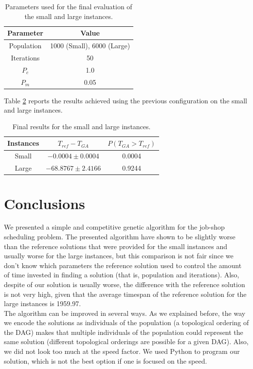 \documentclass[10pt,a4paper]{article}
\begin{document}
\begin{table}[h]
\centering
\begin{tabular}{|c|c|}
\hline
Parameter & Value \\
\hline
Population &  1000 (Small), 6000 (Large)\\
Iterations & 50\\
$P_c$ & 1.0\\
$P_m$ & 0.05\\
\hline
\end{tabular}
\caption{Parameters used for the final evaluation of the small and large instances.}
\label{tab:optimal_params}
\end{table}

Table \ref{tab:final_results} reports the results achieved using the previous configuration on the small and large instances.\\

\begin{table}[h]
\centering
\begin{tabular}{|c|c|c|}
\hline
Instances & $T_{ref} - T_{GA}$ & $P(T_{GA} > T_{ref})$\\
\hline
Small & $-0.0004 \pm 0.0004$ & 0.0004\\ 
Large & $-68.8767 \pm 2.4166$ & 0.9244\\
\hline
\end{tabular}
\caption{Final results for the small and large instances.}
\label{tab:final_results}
\end{table}

\section{Conclusions}
We presented a simple and competitive genetic algorithm for the job-shop scheduling problem. The presented algorithm have shown to be slightly worse than the reference solutions that were provided for the small instances and usually worse for the large instances, but this comparison is not fair since we don't know which parameters the reference solution used to control the amount of time invested in finding a solution (that is, population and iterations). Also, despite of our solution is usually worse, the difference with the reference solution is not very high, given that the average timespan of the reference solution for the large instances is 1959.97.\\

The algorithm can be improved in several ways. As we explained before, the way we encode the solutions as individuals of the population (a topological ordering of the DAG) makes that multiple individuals of the population could represent the same solution (different topological orderings are possible for a given DAG). Also, we did not look too much at the speed factor. We used Python to program our solution, which is not the best option if one is focused on the speed.



\end{document}

